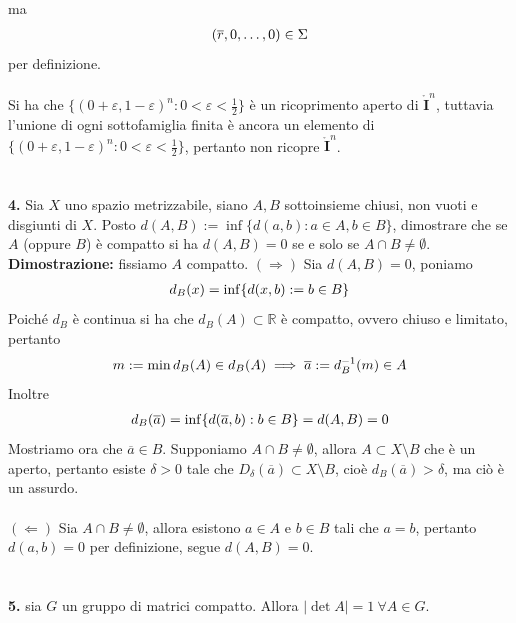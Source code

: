 \documentclass{article}
\begin{document}
ma
\begin{gather}
    (\overline{r}, 0, \dots, 0) \in \Sigma \notag
\end{gather}
per definizione. \\ \\
Si ha che $\{ (0 + \varepsilon, 1 - \varepsilon)^n : 0 < \varepsilon < \frac{1}{2} \}$ è un ricoprimento aperto di $\mathring{\mathbf{I}}^n$, tuttavia l'unione di ogni sottofamiglia finita è ancora un elemento di $\{ (0 + \varepsilon, 1 - \varepsilon)^n : 0 < \varepsilon < \frac{1}{2} \}$, pertanto non ricopre $\mathring{\mathbf{I}}^n$. \\ \\ \\
\textbf{4.} Sia $X$ uno spazio metrizzabile, siano $A, B$ sottoinsieme chiusi, non vuoti e disgiunti di $X$. Posto $d(A, B) := \inf \{ d(a, b) : a \in A, b \in B \}$, dimostrare che se $A$ (oppure $B$) è compatto si ha $d(A,B) = 0$ se e solo se $A \cap B \neq \emptyset$. \\

\textbf{Dimostrazione:} fissiamo $A$ compatto. $(\Rightarrow)$ Sia $d(A, B) = 0$, poniamo
\begin{gather}
    d_B(x) = \inf \{ d(x, b) := b \in B \} \notag
\end{gather}
Poiché $d_B$ è continua si ha che $d_B(A) \subset \mathbb{R}$ è compatto, ovvero chiuso e limitato, pertanto
\begin{gather}
    m := \min d_B(A) \in d_B(A) \notag \implies \overline{a} := d^{-1}_B(m) \in A \notag
\end{gather}
Inoltre
\begin{gather}
    d_B(\overline{a}) = \inf \{ d(\overline{a}, b) : b \in B \} = d(A,B) = 0 \notag
\end{gather}
Mostriamo ora che $\overline{a} \in B$. Supponiamo $A \cap B \neq \emptyset$, allora $A \subset X \setminus B$ che è un aperto, pertanto esiste $\delta > 0$ tale che $D_\delta(\overline{a}) \subset X \setminus B$, cioè $d_B(\overline{a}) > \delta$, ma ciò è un assurdo. \\ \\
$(\Leftarrow)$ Sia $A \cap B \neq \emptyset$, allora esistono $a \in A$ e $b \in B$ tali che $a = b$, pertanto $d(a, b) = 0$ per definizione, segue $d(A, B) = 0$. \\ \\ \\
\textbf{5.} sia $G$ un gruppo di matrici compatto. Allora $|\det A| = 1 \ \forall A \in G$. \\
\end{document}
